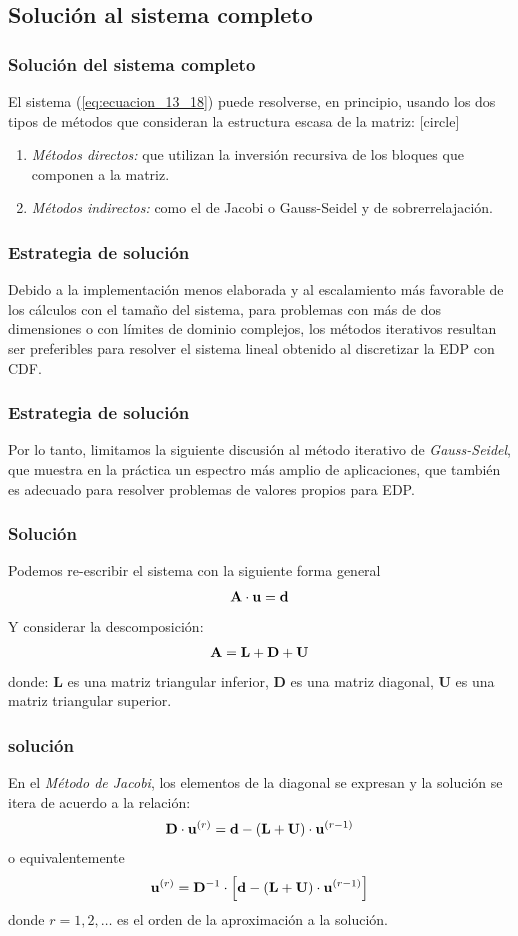 \subsection{Solución al sistema completo}
\begin{frame}
\frametitle{Solución del sistema completo}
El sistema (\ref{eq:ecuacion_13_18}) puede resolverse, en principio, usando los dos tipos de métodos que consideran la estructura escasa de la matriz:
[circle]
\begin{enumerate}[<+->]
\item \emph{Métodos directos: } que utilizan la inversión recursiva de los bloques que componen a la matriz.
\item \emph{Métodos indirectos: } como el de Jacobi o Gauss-Seidel y de sobrerrelajación.
\end{enumerate}
\end{frame}
\begin{frame}
\frametitle{Estrategia de solución}
Debido a la implementación menos elaborada y al escalamiento más favorable de los cálculos con el tamaño del sistema, para problemas con más de dos dimensiones o con límites de dominio complejos, los métodos iterativos resultan ser preferibles para resolver el sistema lineal obtenido al discretizar la EDP con CDF.
\end{frame}
\begin{frame}
\frametitle{Estrategia de solución}
Por lo tanto, limitamos la siguiente discusión al método iterativo de \emph{Gauss-Seidel}, que muestra en la práctica un espectro más amplio de aplicaciones, que también es adecuado para resolver problemas de valores propios para EDP.
\end{frame}
\begin{frame}
\frametitle{Solución}
Podemos re-escribir el sistema con la siguiente forma general
\begin{align}
\vb{A \cdot u} =  \vb{d}
\label{eq:ecuacion_13_19} 
\end{align}
\pause
Y considerar la descomposición:
\begin{align}
\vb{A} = \vb{L} + \vb{D} + \vb{U}
\label{eq:ecuacion_13_20}
\end{align}
donde: $\mathbf{L}$ es una matriz triangular inferior, $\mathbf{D}$ es una matriz diagonal, $\mathbf{U}$ es una matriz triangular superior.
\end{frame}
\begin{frame}
\frametitle{solución}
En el \emph{Método de Jacobi}, los elementos de la diagonal se expresan y la solución se itera de acuerdo a la relación:
\begin{align*}
\vb{D} \cdot \vb{u}^{(r)} = \vb{d} - (\vb{L} + \vb{U}) \cdot \vb{u}^{(r-1)}
\end{align*}
\pause
o equivalentemente
\begin{align}
\vb{u}^{(r)} = \vb{D}^{-1} \cdot \left[ \vb{d} - (\vb{L} + \vb{U}) \cdot \vb{u}^{(r-1)} \right]
\label{eq:ecuacion_13_21}
\end{align}
donde $r = 1, 2, \ldots$ es el orden de la aproximación a la solución.
\end{frame}
